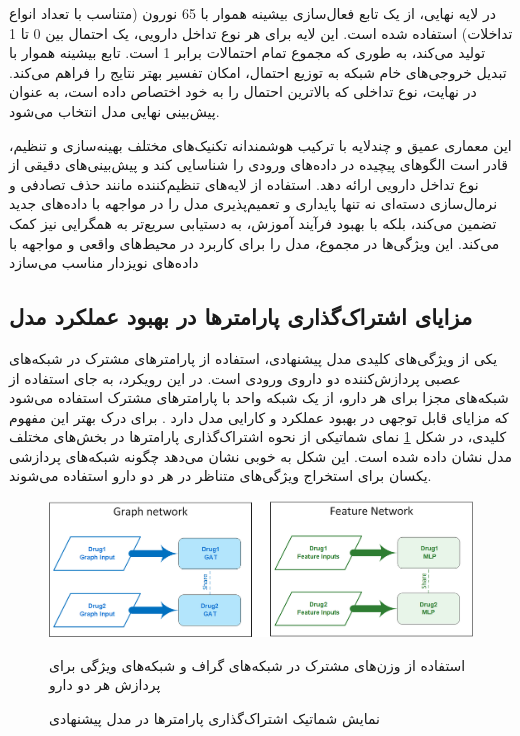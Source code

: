 در لایه نهایی، از یک تابع فعال‌سازی بیشینه هموار با 65 نورون (متناسب با تعداد انواع تداخلات) استفاده شده است. این لایه برای هر نوع تداخل دارویی، یک احتمال بین 0 تا 1 تولید می‌کند، به طوری که مجموع تمام احتمالات برابر 1 است. تابع بیشینه هموار با تبدیل خروجی‌های خام شبکه به توزیع احتمال، امکان تفسیر بهتر نتایج را فراهم می‌کند. در نهایت، نوع تداخلی که بالاترین احتمال را به خود اختصاص داده است، به عنوان پیش‌بینی نهایی مدل انتخاب می‌شود.

این معماری عمیق و چندلایه با ترکیب هوشمندانه تکنیک‌های مختلف بهینه‌سازی و تنظیم، قادر است الگوهای پیچیده در داده‌های ورودی را شناسایی کند و پیش‌بینی‌های دقیقی از نوع تداخل دارویی ارائه دهد. استفاده از لایه‌های تنظیم‌کننده مانند حذف تصادفی و نرمال‌سازی دسته‌ای نه تنها پایداری و تعمیم‌پذیری مدل را در مواجهه با داده‌های جدید تضمین می‌کند، بلکه با بهبود فرآیند آموزش، به دستیابی سریع‌تر به همگرایی نیز کمک می‌کند. این ویژگی‌ها در مجموع، مدل را برای کاربرد در محیط‌های واقعی و مواجهه با داده‌های نویزدار مناسب می‌سازد

\subsection{مزایای اشتراک‌گذاری پارامترها در بهبود عملکرد مدل}

یکی از ویژگی‌های کلیدی مدل پیشنهادی، استفاده از پارامترهای مشترک در شبکه‌های عصبی پردازش‌کننده دو داروی ورودی است. در این رویکرد، به جای استفاده از شبکه‌های مجزا برای هر دارو، از یک شبکه واحد با پارامترهای مشترک استفاده می‌شود که مزایای قابل توجهی در بهبود عملکرد و کارایی مدل دارد \cite{ref_dai2020}. برای درک بهتر این مفهوم کلیدی، در شکل \ref{fig:param_sharing} نمای شماتیکی از نحوه اشتراک‌گذاری پارامترها در بخش‌های مختلف مدل نشان داده شده است. این شکل به خوبی نشان می‌دهد چگونه شبکه‌های پردازشی یکسان برای استخراج ویژگی‌های متناظر در هر دو دارو استفاده می‌شوند.

\begin{figure}[t]
	\centering
	\includegraphics[width=\textwidth]{images/param-sharing.png}
	\caption{نمایش شماتیک اشتراک‌گذاری پارامترها در مدل پیشنهادی} استفاده از وزن‌های مشترک در شبکه‌های گراف و شبکه‌های ویژگی برای پردازش هر دو دارو
	\label{fig:param_sharing}
\end{figure}

